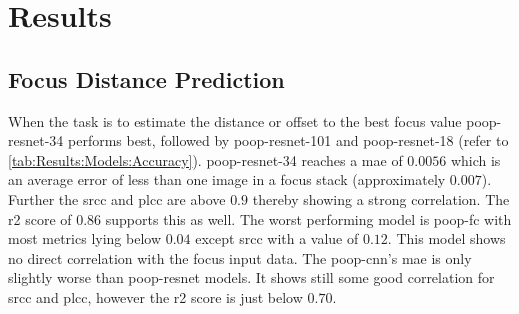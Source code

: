 \chapter{Results}
\label{ch:Results}


\section{Focus Distance Prediction}
\label{sec:Results:FocusDistance}

When the task is to estimate the distance or offset to the best focus value \acs{poop}-\acs{resnet}-34 performs best, followed by \acs{poop}-\acs{resnet}-101 and \acs{poop}-\acs{resnet}-18 (refer to \autoref{tab:Results:Models:Accuracy}). \Acs{poop}-\acs{resnet}-34 reaches a \ac{mae} of $0.0056$ which is an average error of less than one image in a focus stack (approximately $0.007$). Further the \ac{srcc} and \ac{plcc} are above $0.9$ thereby showing a strong correlation. The \ac{r2} score of $0.86$ supports this as well.
The worst performing model is \acs{poop}-\acs{fc} with most metrics lying below $0.04$ except \ac{srcc} with a value of $0.12$. This model shows no direct correlation with the focus input data. The \acs{poop}-\acs{cnn}'s \ac{mae} is only slightly worse than \acs{poop}-\acs{resnet} models. It shows still some good correlation for \ac{srcc} and \ac{plcc}, however the \ac{r2} score is just below $0.70$. 

